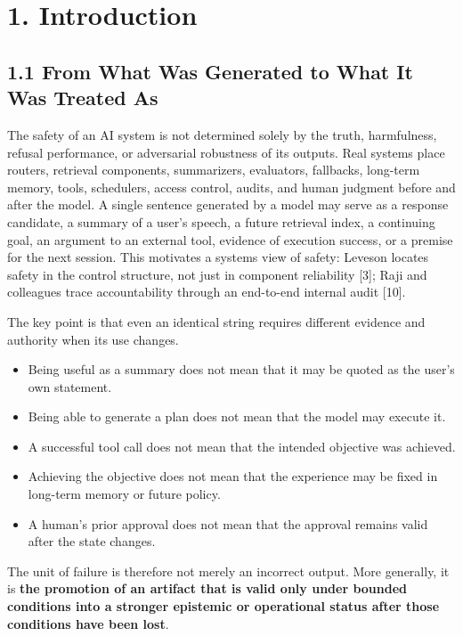 \section{1. Introduction}\label{introduction}

\subsection{1.1 From What Was Generated to What It Was Treated As}\label{from-what-was-generated-to-what-it-was-treated-as}

The safety of an AI system is not determined solely by the truth, harmfulness, refusal performance, or adversarial robustness of its outputs. Real systems place routers, retrieval components, summarizers, evaluators, fallbacks, long-term memory, tools, schedulers, access control, audits, and human judgment before and after the model. A single sentence generated by a model may serve as a response candidate, a summary of a user's speech, a future retrieval index, a continuing goal, an argument to an external tool, evidence of execution success, or a premise for the next session. This motivates a systems view of safety: Leveson locates safety in the control structure, not just in component reliability {[}3{]}; Raji and colleagues trace accountability through an end-to-end internal audit {[}10{]}.

The key point is that even an identical string requires different evidence and authority when its use changes.

\begin{itemize}
\tightlist
\item
  Being useful as a summary does not mean that it may be quoted as the user's own statement.
\item
  Being able to generate a plan does not mean that the model may execute it.
\item
  A successful tool call does not mean that the intended objective was achieved.
\item
  Achieving the objective does not mean that the experience may be fixed in long-term memory or future policy.
\item
  A human's prior approval does not mean that the approval remains valid after the state changes.
\end{itemize}

The unit of failure is therefore not merely an incorrect output. More generally, it is \textbf{the promotion of an artifact that is valid only under bounded conditions into a stronger epistemic or operational status after those conditions have been lost}.

